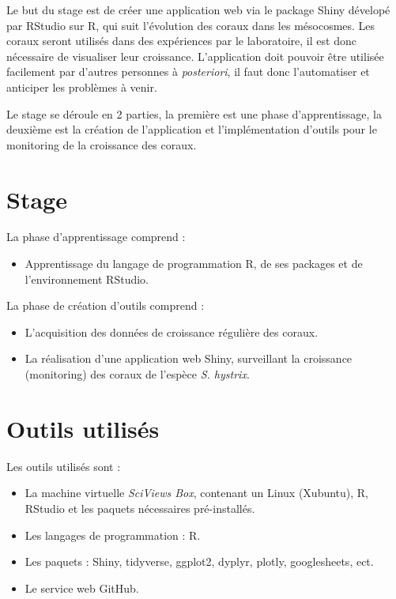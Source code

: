 \documentclass[]{report}
\providecommand{\tightlist}{%
  \setlength{\itemsep}{0pt}\setlength{\parskip}{0pt}}
\begin{document}
Le but du stage est de créer une application web via le package Shiny
dévelopé par RStudio sur R, qui suit l'évolution des coraux dans les
mésocosmes. Les coraux seront utilisés dans des expériences par le
laboratoire, il est donc nécessaire de visualiser leur croissance.
L'application doit pouvoir être utilisée facilement par d'autres
personnes à \emph{posteriori}, il faut donc l'automatiser et anticiper
les problèmes à venir.

Le stage se déroule en 2 parties, la première est une phase
d'apprentissage, la deuxième est la création de l'application et
l'implémentation d'outils pour le monitoring de la croissance des
coraux.

\section{Stage}\label{stage}

La phase d'apprentissage comprend :

\begin{itemize}
\tightlist
\item
  Apprentissage du langage de programmation R, de ses packages et de
  l'environnement RStudio.
\end{itemize}

La phase de création d'outils comprend :

\begin{itemize}
\item
  L'acquisition des données de croissance régulière des coraux.
\item
  La réalisation d'une application web Shiny, surveillant la croissance
  (monitoring) des coraux de l'espèce \emph{S. hystrix}.
\end{itemize}

\section{Outils utilisés}\label{outils-utilises}

Les outils utilisés sont :

\begin{itemize}
\item
  La machine virtuelle \emph{SciViews Box}, contenant un Linux
  (Xubuntu), R, RStudio et les paquets nécessaires pré-installés.
\item
  Les langages de programmation : R.
\item
  Les paquets : Shiny, tidyverse, ggplot2, dyplyr, plotly, googlesheets,
  ect.
\item
  Le service web GitHub.
\end{itemize}
\end{document}
